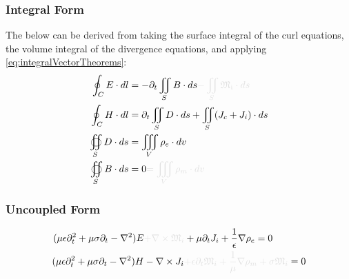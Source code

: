 \documentclass{article}
\numberwithin{equation}{section}
\begin{document}
        \subsubsection{Integral Form}
            The below can be derived from taking the surface integral of the curl
            equations, the volume integral of the divergence equations, and applying 
            \eqref{eq:integralVectorTheorems}:
            \begin{subequations}\label{eq:MaxwellIntegral}
                \begin{align}
                    \oint_C E \cdot dl &=  - \partial_t \iint_S B \cdot ds \begingroup 
                        \textcolor{vanish}{- \iint_S \mathfrak{M_i} \cdot ds} \endgroup 
                        \label{eq:MaxwellFaradayIntegral} \\
                    \oint_C H \cdot dl &= \partial_t \iint_S D \cdot ds + \iint_S 
                        ( J_c + J_i ) \cdot ds \label{eq:AmpereMaxwellIntegral} \\
                    \oiint_S D \cdot ds &= \iiint_V \rho_e \cdot dv 
                        \label{eq:GaussElectricIntegral} \\
                    \oiint_S B \cdot ds &= 0 \begingroup \textcolor{vanish}{= \iiint_V 
                        \rho_m \cdot dv} \endgroup \label{eq:GaussMagneticIntegral}
                \end{align}
            \end{subequations}
        \subsubsection{Uncoupled Form}
            \begin{subequations} \label{eq:fieldEqs}
                \begin{align}
                    (\mu \epsilon \partial^2_t + \mu \sigma \partial_t - \nabla^2 ) E &
                        \begingroup \textcolor{vanish}{+ \nabla \times \mathfrak{M}_i} 
                        \endgroup + \mu \partial_t J_i + \frac{1}{\epsilon} \nabla
                        \rho_e = 0 \label{eq:electricFieldEq} \\
                    (\mu \epsilon \partial^2_t + \mu \sigma \partial_t - \nabla^2 ) H & -
                        \nabla \times J_i \begingroup \textcolor{vanish}{+ \epsilon
                        \partial_t \mathfrak{M}_i + \frac{1}{\mu} \nabla \rho_m + \sigma
                        \mathfrak{M}_i} \endgroup = 0 \label{eq:magneticFieldEq}
                \end{align}
            \end{subequations}
\end{document}
